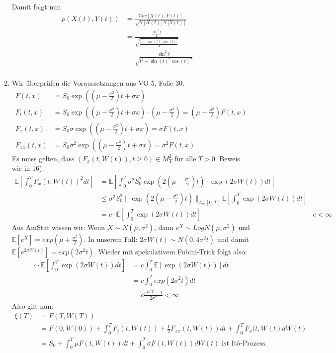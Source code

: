 \documentclass[a4paper,11pt,notitlepage,fullpage]{article}
\newcommand{\Ee}[1]{\mathbb E\left[#1\right]}
\newcommand{\Vv}[1]{\mathbb V\left[#1\right]}
\newcommand{\Cov}[1]{\mathbb Cov\left[#1\right]}
\begin{document}
\begin{enumerate}
Damit folgt nun
\begin{align*}
\rho(X(t), Y(t)) &= \frac{\Cov{X(t), Y(t)}}{\sqrt{\Vv{X(t)}\Vv{Y(t)}}} \\
&= \frac{\frac{\sin^2t}{2}}{\sqrt{ \frac{t^2 - \sin(t)^2\cos(t)^2}{4} }} \\
&= \frac{\sin^2t}{\sqrt{ t^2 - \sin(t)^2\cos(t)^2}}  &\square\\
\end{align*}

\item Wir überprüfen die Voraussetzungen aus VO 5, Folie 30.
\begin{align*}
F(t, x) &= S_0 \exp\left(\left(\mu - \frac{\sigma^2}{2}\right)t + \sigma x\right) \\
F_t(t, x) &= S_0 \exp\left(\left(\mu - \frac{\sigma^2}{2}\right)t + \sigma x\right) \cdot \left(\mu - \frac{\sigma^2}{2}\right) = \left(\mu - \frac{\sigma^2}{2}\right) F(t, x)\\
F_x(t, x) &= S_0 \sigma \exp\left(\left(\mu - \frac{\sigma^2}{2}\right)t + \sigma x\right) = \sigma F(t, x) \\
F_{xx}(t, x) &= S_0 \sigma^2 \exp\left(\left(\mu - \frac{\sigma^2}{2}\right)t + \sigma x\right) = \sigma^2 F(t, x)
\end{align*}
Es muss gelten, dass $(F_x(t, W(t)), t \geq 0) \in M_T^2$ für alle $T > 0$. Beweis wie in 16):
\begin{align*}
\Ee{\int_0^T F_x(t, W(t))^2 dt} &= \Ee{\int_0^T \sigma^2 S_0^2 \exp(2(\mu - \frac{\sigma^2}{2}) t) \cdot \exp(2\sigma W(t)) dt} \\
&\leq  \sigma^2 S_0^2 \|\exp(2(\mu - \frac{\sigma^2}{2}) t)\|_{L_\infty[0, T]} \Ee{\int _0^T \exp(2\sigma W(t)) dt} \\
&= c \cdot \Ee{\int _0^T \exp(2\sigma W(t)) dt} &c < \infty
\end{align*}
Aus AmStat wissen wir: Wenn $X\sim N(\mu, \sigma^2)$, dann $e^X \sim LogN(\mu, \sigma^2)$ und $\Ee{e^X} = exp(\mu + \frac{\sigma^2}{2})$. In unserem Fall: $2\sigma W(t) \sim N(0, 4\sigma^2 t)$ und damit $\Ee{e^{2\sigma W(t)}} =  exp(2\sigma^2 t)$. Wieder mit spekulativem Fubini-Trick folgt also:
\begin{align*}
c \cdot \Ee{\int _0^T \exp(2\sigma W(t)) dt} &= c \int _0^T \Ee{\exp(2\sigma W(t))} dt \\
&= c \int _0^T exp(2\sigma^2 t) dt \\
&= c \frac{e^{2\sigma^2 T}-1}{2\sigma^2} < \infty
\end{align*}
Also gilt nun:
\begin{align*}
\xi(T) &= F(T, W(T)) \\
&= F(0, W(0)) + \int_0^T F_t(t, W(t)) + \frac{1}{2} F_{xx}(t, W(t)) dt + \int_0^T F_x(t, W(t) dW(t) \\
&= S_0 + \int_0^T \mu F(t, W(t)) dt + \int_0^T \sigma F(t, W(t)) dW(t) \text{ ist Itô-Prozess.}
\end{align*}


\end{enumerate}
\end{document}
